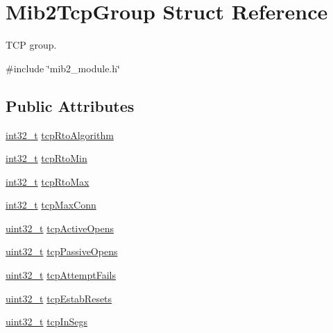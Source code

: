 \hypertarget{structMib2TcpGroup}{}\section{Mib2\+Tcp\+Group Struct Reference}
\label{structMib2TcpGroup}


T\+CP group.  




{\ttfamily \#include \char`\"{}mib2\+\_\+module.\+h\char`\"{}}

\subsection*{Public Attributes}
\begin{DoxyCompactItemize}
\item 
\hyperlink{stdint_8h_ab1967d8591af1a4e48c37fd2b0f184d0}{int32\+\_\+t} \hyperlink{structMib2TcpGroup_a33717ac6289a0a9b1697810ce19599fa}{tcp\+Rto\+Algorithm}
\item 
\hyperlink{stdint_8h_ab1967d8591af1a4e48c37fd2b0f184d0}{int32\+\_\+t} \hyperlink{structMib2TcpGroup_a0e760e3fd82783b29274022c35eb293b}{tcp\+Rto\+Min}
\item 
\hyperlink{stdint_8h_ab1967d8591af1a4e48c37fd2b0f184d0}{int32\+\_\+t} \hyperlink{structMib2TcpGroup_a3a2b489e16ac298b666f9ec4f1fe5335}{tcp\+Rto\+Max}
\item 
\hyperlink{stdint_8h_ab1967d8591af1a4e48c37fd2b0f184d0}{int32\+\_\+t} \hyperlink{structMib2TcpGroup_a49e07f58db90740be9bb0dec186d3fa4}{tcp\+Max\+Conn}
\item 
\hyperlink{stdint_8h_a435d1572bf3f880d55459d9805097f62}{uint32\+\_\+t} \hyperlink{structMib2TcpGroup_a0497d623d5b6e74aea51b39cf4d2d995}{tcp\+Active\+Opens}
\item 
\hyperlink{stdint_8h_a435d1572bf3f880d55459d9805097f62}{uint32\+\_\+t} \hyperlink{structMib2TcpGroup_a1d6b7c2722e8a553f2a338b20a2d5801}{tcp\+Passive\+Opens}
\item 
\hyperlink{stdint_8h_a435d1572bf3f880d55459d9805097f62}{uint32\+\_\+t} \hyperlink{structMib2TcpGroup_a7b805df77f0d079b29e91337d7effef0}{tcp\+Attempt\+Fails}
\item 
\hyperlink{stdint_8h_a435d1572bf3f880d55459d9805097f62}{uint32\+\_\+t} \hyperlink{structMib2TcpGroup_a884ce616c038f8b0c4e619067cc0cb75}{tcp\+Estab\+Resets}
\item 
\hyperlink{stdint_8h_a435d1572bf3f880d55459d9805097f62}{uint32\+\_\+t} \hyperlink{structMib2TcpGroup_a299e1f81b2aad58bdeac77bd88e21b38}{tcp\+In\+Segs}

\end{DoxyCompactItemize}
